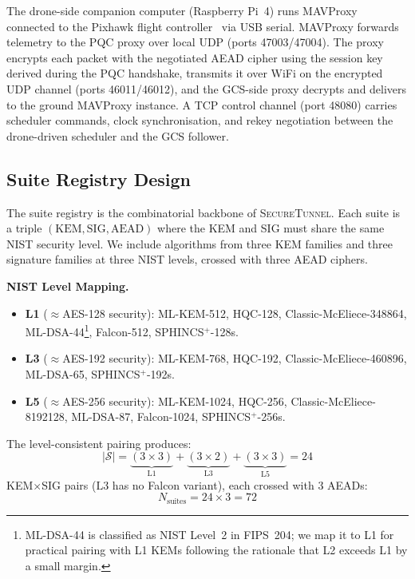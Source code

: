 \documentclass[conference]{IEEEtran}
\newcommand{\sys}{\textsc{SecureTunnel}}
\begin{document}
The drone-side companion computer (Raspberry Pi~4) runs MAVProxy~\cite{mavproxy} connected to the Pixhawk flight controller~\cite{pixhawk} via USB serial.
MAVProxy forwards telemetry to the PQC proxy over local UDP (ports 47003/47004).
The proxy encrypts each packet with the negotiated AEAD cipher using the session key derived during the PQC handshake, transmits it over WiFi on the encrypted UDP channel (ports 46011/46012), and the GCS-side proxy decrypts and delivers to the ground MAVProxy instance.
A TCP control channel (port 48080) carries scheduler commands, clock synchronisation, and rekey negotiation between the drone-driven scheduler and the GCS follower.

\subsection{Suite Registry Design}
\label{sec:suite-registry}

The suite registry is the combinatorial backbone of \sys{}.
Each suite is a triple $(\mathrm{KEM}, \mathrm{SIG}, \mathrm{AEAD})$ where the KEM and SIG must share the same NIST security level.
We include algorithms from three KEM families and three signature families at three NIST levels, crossed with three AEAD ciphers.

\textbf{NIST Level Mapping.}
\begin{itemize}[noitemsep]
    \item \textbf{L1} ($\approx$AES-128 security): ML-KEM-512, HQC-128, Classic-McEliece-348864, ML-DSA-44\footnote{ML-DSA-44 is classified as NIST Level~2 in FIPS~204; we map it to L1 for practical pairing with L1 KEMs following the rationale that L2 exceeds L1 by a small margin.}, Falcon-512, SPHINCS$^+$-128s.
    \item \textbf{L3} ($\approx$AES-192 security): ML-KEM-768, HQC-192, Classic-McEliece-460896, ML-DSA-65, SPHINCS$^+$-192s.
    \item \textbf{L5} ($\approx$AES-256 security): ML-KEM-1024, HQC-256, Classic-McEliece-8192128, ML-DSA-87, Falcon-1024, SPHINCS$^+$-256s.
\end{itemize}

The level-consistent pairing produces:
\begin{equation}
\label{eq:suite-count}
    |\mathcal{S}| = \underbrace{(3 \times 3)}_{\text{L1}} + \underbrace{(3 \times 2)}_{\text{L3}} + \underbrace{(3 \times 3)}_{\text{L5}} = 24
\end{equation}
KEM$\times$SIG pairs ($\text{L3}$ has no Falcon variant), each crossed with 3 AEADs:
\begin{equation}
    N_{\text{suites}} = 24 \times 3 = 72
\end{equation}
\end{document}
